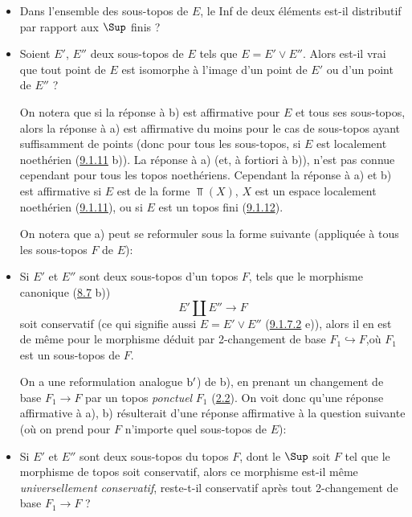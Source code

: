 \documentclass[10pt]{../fichiers-configuration-latex/smfart}
\begin{document}
\begin{itemize}
\item[a)] Dans l'ensemble des sous-topos de $E$, le Inf de deux
éléments est-il distributif par rapport aux $\Sup$ finis ?

\item[b)] Soient $E'$, $E''$ deux sous-topos de $E$ tels que $E=E'\vee
E''$. Alors est-il vrai que tout point de $E$ est isomorphe à
l'image d'un point de $E'$ ou d'un point de $E''$ ?

On notera que si la réponse à b) est affirmative pour $E$ et tous
ses sous-topos, alors la réponse à a) est affirmative du moins pour
le cas de sous-topos ayant suffisamment de points (donc pour tous
les sous-topos, si $E$ est localement noethérien
(\hyperref[IV.exer9.1.11]{9.1.11} b)). La réponse à a) (et, à fortiori à b)),
n'est pas connue cependant pour tous les topos noethériens.
Cependant la réponse à a) et b) est affirmative si $E$ est de la
forme $\Top(X)$, $X$ est un espace localement noethérien
(\hyperref[IV.exer9.1.11]{9.1.11}), ou si $E$ est un topos fini
(\hyperref[IV.exer9.1.12]{9.1.12}).

On notera que a) peut se reformuler sous la forme suivante
(appliquée à tous les sous-topos $F$ de $E$):

\item[$\rm a'$)] Si $E'$ et $E''$ sont deux sous-topos d'un topos $F$,
tels que le morphisme canonique (\cf \hyperref[IV.exer8.7]{8.7} b))
\begin{equation*}
E'\amalg E''\longrightarrow F\tag{9.1.14.1}
\end{equation*}
soit conservatif (ce qui signifie aussi $E=E'\vee E''$
(\hyperref[IV.exer9.1.7.2]{9.1.7.2} e)), alors il en est de même pour le morphisme
déduit par 2-changement de base $F_1\hookrightarrow
F$,\pageoriginale où $F_1$ est un sous-topos de $F$.

On a une reformulation analogue $\rm b'$) de b), en prenant un
changement de base $F_1\rightarrow F$ par un topos \emph{ponctuel}
$F_1$ (\hyperref[IV.subsec2.2]{2.2}). On voit donc qu'une réponse affirmative
à a), b) résulterait d'une réponse affirmative à la question
suivante (où on prend pour $F$ n'importe quel sous-topos de $E$):

\item[c)] Si $E'$ et $E''$ sont deux sous-topos du topos $F$, dont le
$\Sup$ soit $F$ \ie tel que le morphisme de topos  soit
conservatif, alors ce morphisme est-il même \emph{universellement
conservatif}, \ie reste-t-il conservatif après tout 2-changement de
base $F_1\rightarrow F$ ?


\end{itemize}
\end{document}
